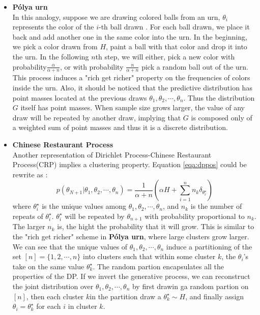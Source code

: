 \begin{itemize}
	\item \textbf{P\'{o}lya urn} \\
	In this analogy, suppose we are drawing colored balls from an urn, $\theta_i$ represents the color of the $i$-th ball drawn . For each ball drawn, we place it back  and add another one in the same color into the urn. In  the beginning, we pick a color drawn from $H$, paint a ball with that color and drop it into the urn. In the following $n$th step, we will either, pick a new color with probability$\frac{\alpha}{\alpha+n}$, or with probability $\frac{n}{\alpha+n}$ pick a random ball out of the urn.  This process induces a "rich get richer" property on the frequencies of colors inside the urn. Also, it should be noticed that the predictive distribution has point masses located at the previous draws  $\theta_1,\theta_2,\cdots,\theta_n$. Thus the distribution $G$ itself has point masses. When sample size grows larger, the value of any draw will be repeated by another draw, implying that $G$ is composed only of a weighted sum of point masses and thus  it is a discrete distribution.
	\item \textbf{Chinese Restaurant Process}\\
	Another representation of Dirichlet Process-Chinese Restaurant Process(CRP) implies a clustering property. Equation \ref{eqa:dppos} could be rewrite as :
	\begin{equation}
		p(\theta_{N+1}|\theta_1,\theta_2,\cdots,\theta_n) = \frac{1}{\alpha+n}\left(\alpha H+\sum\limits_{i=1}^{n}n_k\delta_{\theta_i^\star}\right)
	\end{equation}
	where $\theta_i^\star$ is the unique values among $\theta_1,\theta_2,\cdots,\theta_n$, and $n_k$ is the number of repeats of $\theta_i^\star$. $\theta_i^\star$ will be repeated by $\theta_{n+1}$ with probability proportional to $n_k$. The larger $n_k$ is, the hight the probability that it will grow. This is similar to the "rich get richer" scheme in \textbf{P\'{o}lya urn}, where large clusters grow larger. We can see that the unique values  of $\theta_1,\theta_2,\cdots,\theta_n$ induce a partitioning of the set $[n]=\{1,2,\cdots,n\}$ into clusters such that within some cluster $k$, the $\theta_i$'s take on the same value $\theta_k^\star$. The random partion encapsulates all the properties of the DP. If we invert the generative process, we can reconstruct the joint distribution over $\theta_1,\theta_2,\cdots,\theta_n$ by first drawin ga random partion on $[n]$, then each cluster $k$in the partition draw a $\theta_k^\star\sim H$, and finally assign $\theta_i=\theta_k^\star$ for each $i$ in cluster $k$. 
	

\end{itemize}
